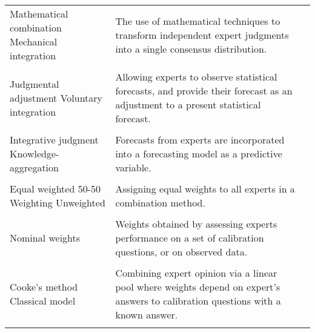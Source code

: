 \documentclass[preprint,authoryear,nonatbib]{elsarticle}
\begin{document}
\begin{longtable}{L{6cm} L{5cm} L{3cm}}
         Mathematical combination \hspace{35mm}
         Mechanical integration      & The use of mathematical techniques to transform independent expert judgments into a single consensus distribution. & 
         \parencite{clemen2007advances,petrovic2006fuzzy}\\
         \vspace{0.0625mm}\\    
         
         Judgmental adjustment
         Voluntary integration & Allowing experts to observe statistical forecasts, and provide their forecast as an adjustment to a present statistical forecast. & 
         \parencite{alvarado2017expertise,huang2016improving,song2013combining,baecke2017investigating}\\
        \vspace{0.0625mm}\\    
         
         Integrative judgment
         Knowledge-aggregation & Forecasts from experts are incorporated into a forecasting model as a predictive variable. & 
         \parencite{baecke2017investigating,mak1996aggregating}\\ 
         \vspace{0.0625mm}\\    
         
         Equal weighted  \hspace{35mm} 
         50-50 Weighting \hspace{35mm} 
         Unweighted & Assigning equal weights to all experts in a combination method. & 
         \parencite{cooke2014out,hanea2018value,alvarado2017expertise,ISI:000327676900001,graefe2015accuracy}\\
         \vspace{0.0625mm}\\    
         
         Nominal weights & Weights obtained by assessing experts performance on a set of calibration questions, or on observed data.
         & \parencite{baldwin2015weighting}\\
        \vspace{0.0625mm}\\     
         
         Cooke's method\hspace{35mm}
         Classical model & Combining expert opinion via a linear pool where weights depend on expert's answers to calibration questions with a known answer. &
         \parencite{cooke2014out,morales2017characterization,zio1996use,hanea2018value,hathout2016uncertainty,bolger2017deriving,clemen2007advances,brito2012behavioral,hora2015calibration, ISI:000327676900001}\\ 
        \vspace{0.0625mm}\\    
          

\end{longtable}
\end{document}
